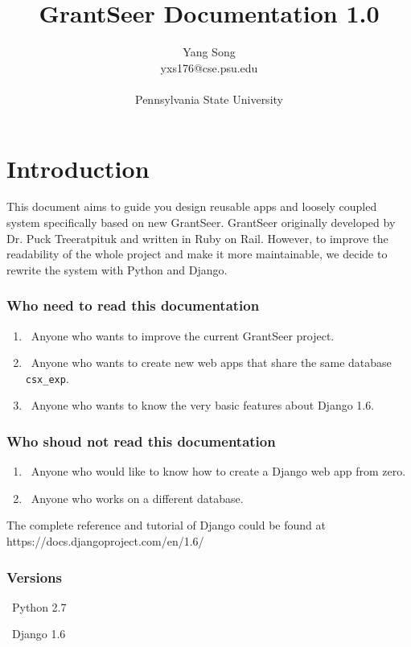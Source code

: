 \documentclass[12pt]{article}
\begin{document}
\title{GrantSeer Documentation 1.0}
\author{Yang Song \\ yxs176@cse.psu.edu \\\\ Pennsylvania State University}
\date{}
\maketitle

\section{Introduction}
This document aims to guide you design reusable apps and loosely coupled system specifically based on new GrantSeer. GrantSeer originally developed by Dr. Puck Treeratpituk and written in Ruby on Rail. However, to improve the readability of the whole project and make it more maintainable, we decide to rewrite the system with Python and Django.

\subsubsection*{Who need to read this documentation}
\begin{enumerate}
	\item\ Anyone who wants to improve the current GrantSeer project.
	\item\ Anyone who wants to create new web apps that share the same database \texttt{csx\_exp}.
	\item\ Anyone who wants to know the very basic features about Django 1.6.
\end{enumerate}

\subsubsection*{Who shoud not read this documentation}
\begin{enumerate}
	\item\ Anyone who would like to know how to create a Django web app from zero.
	\item\ Anyone who works on a different database.
\end{enumerate}

The complete reference and tutorial of Django could be found at \\ https://docs.djangoproject.com/en/1.6/

\subsubsection*{Versions}
\begin{description}
	\item\ Python 2.7
	\item\ Django 1.6
\end{description}
\end{document}
